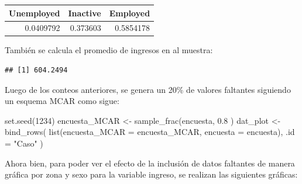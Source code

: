 \documentclass[
  12pt,
]{book}
\newenvironment{Shaded}{\begin{snugshade}}{\end{snugshade}}
\newcommand{\AttributeTok}[1]{\textcolor[rgb]{0.77,0.63,0.00}{#1}}
\newcommand{\ConstantTok}[1]{\textcolor[rgb]{0.00,0.00,0.00}{#1}}
\newcommand{\DecValTok}[1]{\textcolor[rgb]{0.00,0.00,0.81}{#1}}
\newcommand{\FloatTok}[1]{\textcolor[rgb]{0.00,0.00,0.81}{#1}}
\newcommand{\FunctionTok}[1]{\textcolor[rgb]{0.00,0.00,0.00}{#1}}
\newcommand{\NormalTok}[1]{#1}
\newcommand{\OtherTok}[1]{\textcolor[rgb]{0.56,0.35,0.01}{#1}}
\newcommand{\SpecialCharTok}[1]{\textcolor[rgb]{0.00,0.00,0.00}{#1}}
\newcommand{\StringTok}[1]{\textcolor[rgb]{0.31,0.60,0.02}{#1}}
\begin{document}
\begin{tabular}{r|r|r}
\hline
Unemployed & Inactive & Employed\\
\hline
0.0409792 & 0.373603 & 0.5854178\\
\hline
\end{tabular}

También se calcula el promedio de ingresos en al muestra:

\begin{Shaded}
\end{Shaded}

\begin{verbatim}
## [1] 604.2494
\end{verbatim}

Luego de los conteos anteriores, se genera un 20\% de valores faltantes siguiendo un esquema MCAR como sigue:

\begin{Shaded}
\begin{Highlighting}[]
\FunctionTok{set.seed}\NormalTok{(}\DecValTok{1234}\NormalTok{)}
\NormalTok{encuesta\_MCAR }\OtherTok{\textless{}{-}}  \FunctionTok{sample\_frac}\NormalTok{(encuesta, }\FloatTok{0.8}\NormalTok{ )}
\NormalTok{dat\_plot }\OtherTok{\textless{}{-}}       \FunctionTok{bind\_rows}\NormalTok{(}
  \FunctionTok{list}\NormalTok{(}\AttributeTok{encuesta\_MCAR =}\NormalTok{ encuesta\_MCAR, }
       \AttributeTok{encuesta =}\NormalTok{ encuesta), }\AttributeTok{.id =} \StringTok{"Caso"}\NormalTok{  )}
\end{Highlighting}
\end{Shaded}

Ahora bien, para poder ver el efecto de la inclusión de datos faltantes de manera gráfica por zona y sexo para la variable ingreso, se realizan las siguientes gráficas:
\end{document}
